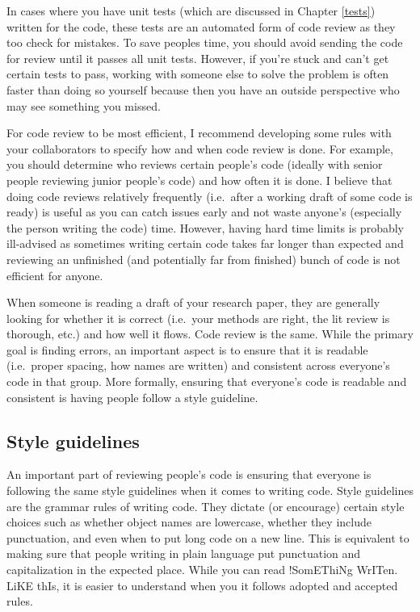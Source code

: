 \documentclass[
]{krantz}
\begin{document}
In cases where you have unit tests (which are discussed in Chapter \ref{tests}) written for the code, these tests are an automated form of code review as they too check for mistakes. To save peoples time, you should avoid sending the code for review until it passes all unit tests. However, if you're stuck and can't get certain tests to pass, working with someone else to solve the problem is often faster than doing so yourself because then you have an outside perspective who may see something you missed.

For code review to be most efficient, I recommend developing some rules with your collaborators to specify how and when code review is done. For example, you should determine who reviews certain people's code (ideally with senior people reviewing junior people's code) and how often it is done. I believe that doing code reviews relatively frequently (i.e.~after a working draft of some code is ready) is useful as you can catch issues early and not waste anyone's (especially the person writing the code) time. However, having hard time limits is probably ill-advised as sometimes writing certain code takes far longer than expected and reviewing an unfinished (and potentially far from finished) bunch of code is not efficient for anyone.

When someone is reading a draft of your research paper, they are generally looking for whether it is correct (i.e.~your methods are right, the lit review is thorough, etc.) and how well it flows. Code review is the same. While the primary goal is finding errors, an important aspect is to ensure that it is readable (i.e.~proper spacing, how names are written) and consistent across everyone's code in that group. More formally, ensuring that everyone's code is readable and consistent is having people follow a style guideline.

\hypertarget{style-guidelines}{%
\subsection{Style guidelines}\label{style-guidelines}}

An important part of reviewing people's code is ensuring that everyone is following the same style guidelines when it comes to writing code. Style guidelines are the grammar rules of writing code. They dictate (or encourage) certain style choices such as whether object names are lowercase, whether they include punctuation, and even when to put long code on a new line. This is equivalent to making sure that people writing in plain language put punctuation and capitalization in the expected place. While you can read !SomEThiNg WrITen. LiKE thIs, it is easier to understand when you it follows adopted and accepted rules.
\end{document}
